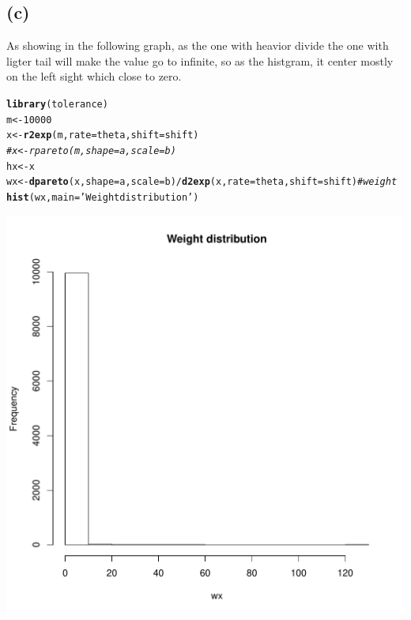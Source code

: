 \documentclass{article}\usepackage[]{graphicx}\usepackage[]{color}
\makeatletter
\def\maxwidth{ %
  \ifdim\Gin@nat@width>\linewidth
    \linewidth
  \else
    \Gin@nat@width
  \fi
}
\newcommand{\hlnum}[1]{\textcolor[rgb]{0.686,0.059,0.569}{#1}}%
\newcommand{\hlstr}[1]{\textcolor[rgb]{0.192,0.494,0.8}{#1}}%
\newcommand{\hlcom}[1]{\textcolor[rgb]{0.678,0.584,0.686}{\textit{#1}}}%
\newcommand{\hlopt}[1]{\textcolor[rgb]{0,0,0}{#1}}%
\newcommand{\hlstd}[1]{\textcolor[rgb]{0.345,0.345,0.345}{#1}}%
\newcommand{\hlkwb}[1]{\textcolor[rgb]{0.69,0.353,0.396}{#1}}%
\newcommand{\hlkwc}[1]{\textcolor[rgb]{0.333,0.667,0.333}{#1}}%
\newcommand{\hlkwd}[1]{\textcolor[rgb]{0.737,0.353,0.396}{\textbf{#1}}}%
\newenvironment{kframe}{%
 \def\at@end@of@kframe{}%
 \ifinner\ifhmode%
  \def\at@end@of@kframe{\end{minipage}}%
  \begin{minipage}{\columnwidth}%
 \fi\fi%
 \def\FrameCommand##1{\hskip\@totalleftmargin \hskip-\fboxsep
 \colorbox{shadecolor}{##1}\hskip-\fboxsep
     \hskip-\linewidth \hskip-\@totalleftmargin \hskip\columnwidth}%
 \MakeFramed {\advance\hsize-\width
   \@totalleftmargin\z@ \linewidth\hsize
   \@setminipage}}%
 {\par\unskip\endMakeFramed%
 \at@end@of@kframe}
\newenvironment{knitrout}{}{} %
\makeatother
\begin{document}
\subsection{(c)}
As showing in the following graph, as the one with heavior divide the one with ligter tail will make the value go to infinite, so as the histgram, it center mostly on the left sight which close to zero.
\begin{knitrout}
\color{fgcolor}\begin{kframe}
\begin{alltt}
\hlkwd{library}\hlstd{(tolerance)}
\hlstd{m} \hlkwb{<-} \hlnum{10000}
\hlstd{x} \hlkwb{<-} \hlkwd{r2exp}\hlstd{(m,} \hlkwc{rate} \hlstd{= theta,} \hlkwc{shift} \hlstd{= shift)}
\hlcom{#x <- rpareto(m, shape= a, scale = b)}
\hlstd{hx} \hlkwb{<-} \hlstd{x}
\hlstd{wx} \hlkwb{<-} \hlkwd{dpareto}\hlstd{(x,} \hlkwc{shape}\hlstd{=a,} \hlkwc{scale} \hlstd{= b)}\hlopt{/}\hlkwd{d2exp}\hlstd{(x,} \hlkwc{rate} \hlstd{= theta,} \hlkwc{shift} \hlstd{= shift)} \hlcom{#weight}
\hlkwd{hist}\hlstd{(wx,} \hlkwc{main}\hlstd{=}\hlstr{'Weight distribution'}\hlstd{)}
\end{alltt}
\end{kframe}
\includegraphics[width=\maxwidth]{figure/unnamed-chunk-3-1} 
\begin{kframe}\begin{alltt}

\end{alltt}
\end{kframe}
\end{knitrout}
\end{document}
